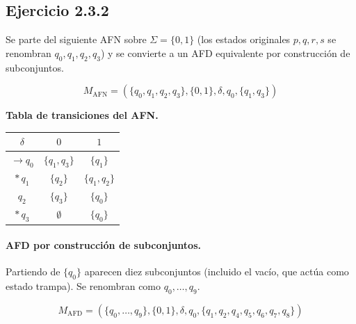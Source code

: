 \documentclass[12pt]{article}
\begin{document}
\subsection{Ejercicio 2.3.2}

Se parte del siguiente AFN sobre $\Sigma=\{0,1\}$ (los estados originales $p,q,r,s$ se renombran $q_0,q_1,q_2,q_3$) y se convierte a un AFD equivalente por construcción de subconjuntos.

\[
M_{\text{AFN}}=(\{q_0,q_1,q_2,q_3\},\{0,1\},\delta,q_0,\{q_1,q_3\})
\]

\begin{center}
\end{center}

\noindent\textbf{Tabla de transiciones del AFN.}
\begin{center}
\begin{tabular}{c|cc}
$\delta$ & $0$ & $1$\\ \hline
$\rightarrow q_0$ & $\{q_1,q_3\}$ & $\{q_1\}$\\
$*\,q_1$ & $\{q_2\}$ & $\{q_1,q_2\}$\\
$q_2$ & $\{q_3\}$ & $\{q_0\}$\\
$*\,q_3$ & $\emptyset$ & $\{q_0\}$\\
\end{tabular}
\end{center}

\paragraph{AFD por construcción de subconjuntos.} Partiendo de $\{q_0\}$ aparecen diez subconjuntos (incluido el vacío, que actúa como estado trampa). Se renombran como $q_0,\dots,q_9$.

\[
M_{\text{AFD}}=(\{q_0,\dots,q_9\},\{0,1\},\delta,q_0,\{q_1,q_2,q_4,q_5,q_6,q_7,q_8\})
\]
\end{document}
